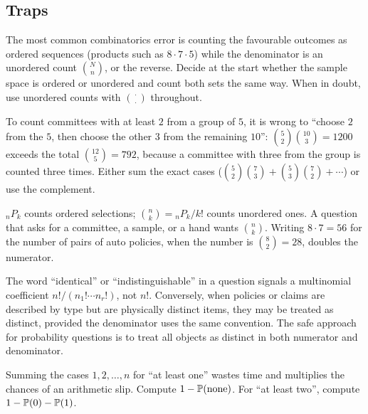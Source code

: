 \subsection{Traps}

\begin{trap}
The most common combinatorics error is counting the favourable outcomes as ordered sequences
(products such as $8\cdot 7\cdot 5$) while the denominator is an unordered count
$\binom{N}{n}$, or the reverse. Decide at the start whether the sample space is ordered or
unordered and count both sets the same way. When in doubt, use unordered counts with
$\binom{\cdot}{\cdot}$ throughout.
\end{trap}

\begin{trap}
To count committees with at least $2$ from a group of $5$, it is wrong to ``choose $2$ from
the $5$, then choose the other $3$ from the remaining $10$'': $\binom{5}{2}\binom{10}{3} = 1200$
exceeds the total $\binom{12}{5}=792$, because a committee with three from the group is counted
three times. Either sum the exact cases ($\binom{5}{2}\binom{7}{3} + \binom{5}{3}\binom{7}{2} + \cdots$)
or use the complement.
\end{trap}

\begin{trap}
${}_nP_k$ counts ordered selections; $\binom{n}{k} = {}_nP_k/k!$ counts unordered ones. A
question that asks for a committee, a sample, or a hand wants $\binom{n}{k}$. Writing
$8\cdot 7 = 56$ for the number of pairs of auto policies, when the number is
$\binom{8}{2} = 28$, doubles the numerator.
\end{trap}

\begin{trap}
The word ``identical'' or ``indistinguishable'' in a question signals a multinomial
coefficient $n!/(n_1!\cdots n_r!)$, not $n!$. Conversely, when policies or claims are described
by type but are physically distinct items, they may be treated as distinct, provided the
denominator uses the same convention. The safe approach for probability questions is to treat
all objects as distinct in both numerator and denominator.
\end{trap}

\begin{trap}
Summing the cases $1, 2, \dots, n$ for ``at least one'' wastes time and multiplies the chances
of an arithmetic slip. Compute $1 - \mathbb{P}(\text{none})$. For ``at least two'', compute
$1 - \mathbb{P}(0) - \mathbb{P}(1)$.
\end{trap}

